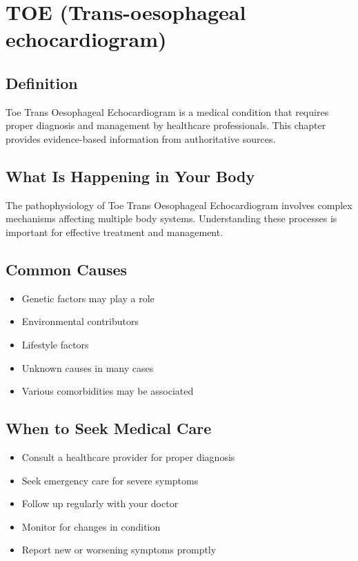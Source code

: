 
\chapter{TOE (Trans-oesophageal echocardiogram)}

\section*{Definition}
Toe Trans Oesophageal Echocardiogram is a medical condition that requires proper diagnosis and management by healthcare professionals. This chapter provides evidence-based information from authoritative sources.

\section*{What Is Happening in Your Body}
The pathophysiology of Toe Trans Oesophageal Echocardiogram involves complex mechanisms affecting multiple body systems. Understanding these processes is important for effective treatment and management.

\section*{Common Causes}
\begin{itemize}
  \item Genetic factors may play a role
  \item Environmental contributors
  \item Lifestyle factors
  \item Unknown causes in many cases
  \item Various comorbidities may be associated
\end{itemize}

\section*{When to Seek Medical Care}
\begin{itemize}
  \item Consult a healthcare provider for proper diagnosis
  \item Seek emergency care for severe symptoms
  \item Follow up regularly with your doctor
  \item Monitor for changes in condition
  \item Report new or worsening symptoms promptly
\end{itemize}

